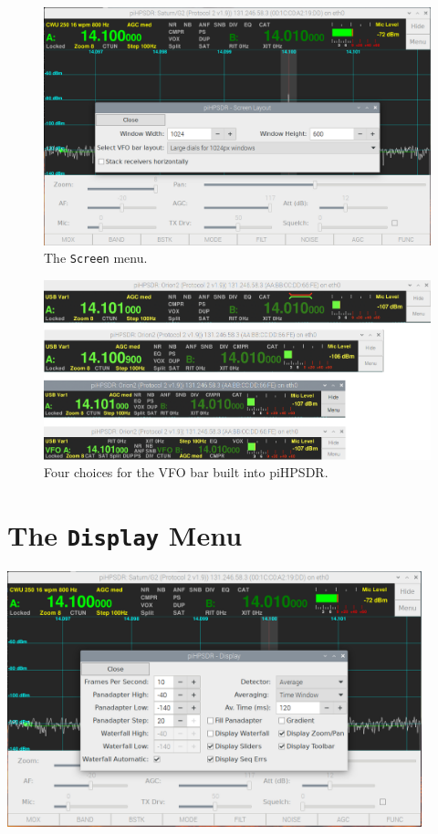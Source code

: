 \documentclass[12pt]{book}
\begin{document}
\begin{figure}[h]
\center
\includegraphics[width=12cm]{ScreenMenu.png}
\caption{The \texttt{Screen} menu.}
\end{figure}

\begin{figure}[h]
\center
\includegraphics[width=12cm]{VFObarChoice.png}
\caption{Four choices for the VFO bar built into piHPSDR.}
\label{fig:VFObarChoice}
\end{figure}

\section{The \texttt{Display} Menu}
\begin{center}
\includegraphics[width=12cm]{DisplayMenu.png}
\end{center}
\end{document}
